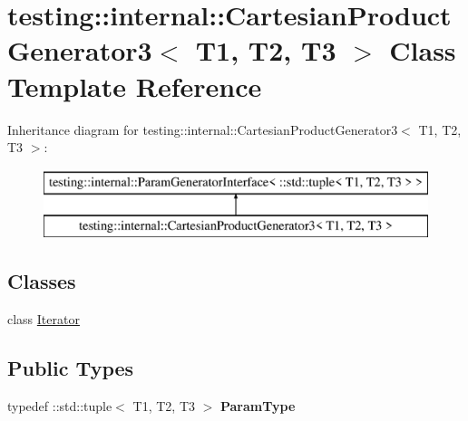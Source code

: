 \hypertarget{classtesting_1_1internal_1_1_cartesian_product_generator3}{}\section{testing\+:\+:internal\+:\+:Cartesian\+Product\+Generator3$<$ T1, T2, T3 $>$ Class Template Reference}
\label{classtesting_1_1internal_1_1_cartesian_product_generator3}
Inheritance diagram for testing\+:\+:internal\+:\+:Cartesian\+Product\+Generator3$<$ T1, T2, T3 $>$\+:\begin{figure}[H]
\begin{center}
\leavevmode
\includegraphics[height=2.000000cm]{classtesting_1_1internal_1_1_cartesian_product_generator3}
\end{center}
\end{figure}
\subsection*{Classes}
\begin{DoxyCompactItemize}
\item 
class \mbox{\hyperlink{classtesting_1_1internal_1_1_cartesian_product_generator3_1_1_iterator}{Iterator}}
\end{DoxyCompactItemize}
\subsection*{Public Types}
\begin{DoxyCompactItemize}
\item 
\mbox{\label{classtesting_1_1internal_1_1_cartesian_product_generator3_a8ef3e248a6d5ba1ea4ae17a8d045e98a}} 
typedef \+::std\+::tuple$<$ T1, T2, T3 $>$ {\bfseries Param\+Type}
\end{DoxyCompactItemize}
